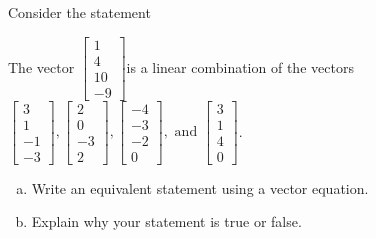 
\begin{exerciseStatement}


Consider the statement 
\begin{center}\begin{minipage}{0.8\textwidth}
 The vector \( \left[\begin{array}{c}
1 \\
4 \\
10 \\
-9
\end{array}\right] \)is a linear combination of the vectors \( \left[\begin{array}{c}
3 \\
1 \\
-1 \\
-3
\end{array}\right] , \left[\begin{array}{c}
2 \\
0 \\
-3 \\
2
\end{array}\right] , \left[\begin{array}{c}
-4 \\
-3 \\
-2 \\
0
\end{array}\right] , \text{ and } \left[\begin{array}{c}
3 \\
1 \\
4 \\
0
\end{array}\right] \). 
\end{minipage}\end{center}
    


\begin{enumerate}[(a)]
\item  Write an equivalent statement using a vector equation.
\item  Explain why your statement is true or false.
\end{enumerate}
    
\end{exerciseStatement}
    
